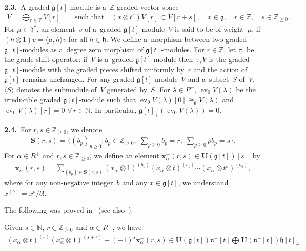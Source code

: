 \documentclass[pdftex]{sigma}
\DeclareMathOperator{\ev}{ev}
\numberwithin{equation}{section}
\begin{document}
{\bf 2.3.}~A graded $\mathfrak{g}[t]$-module is a~$\mathbb{Z}$-graded vector space
\begin{gather*}
V=\bigoplus_{r\in\mathbb{Z}} V[r] \qquad
\text{such that}
\quad
(x\otimes t^s) V[r]\subset V[r+s],
\quad
x\in\mathfrak{g},
\quad
r\in\mathbb{Z},
\quad
s\in\mathbb{Z}_{\geq0}.
\end{gather*}
For $\mu\in\mathfrak{h}^*$, an element~$v$ of a~graded $\mathfrak{g}[t]$-module~$V$ is said to be of weight~$\mu$, if
$(h\otimes 1)v=\langle \mu, h\rangle v$ for all $h\in \mathfrak{h}$.
We def\/ine a~morphism between two graded $\mathfrak{g}[t]$-modules as a~degree zero morphism of
$\mathfrak{g}[t]$-modules.
For $r\in\mathbb{Z}$, let $\tau_r$ be the grade shift operator: if~$V$ is a~graded $\mathfrak{g}[t]$-module then~$\tau_r
V$ is the graded $\mathfrak{g}[t]$-module with the graded pieces shifted uniformly by~$r$ and the action of~$\mathfrak{g}[t]$ remains unchanged.
For any graded $\mathfrak{g}[t]$-module~$V$ and a~subset~$S$ of~$V$, $\langle S\rangle$ denotes the submodule of~$V$ generated by~$S$.
For $\lambda\in P^+$, $\ev_0 V(\lambda)$ be the irreducible graded $\mathfrak{g}[t]$-module such
that $\ev_0 V(\lambda)[0]\cong_{\mathfrak{g}} V(\lambda)$ and $\ev_0 V(\lambda)[r]=0$
$\forall\, r\in \mathbb{N}$.
In particular, $\mathfrak{g}[t]_{+}(\ev_0 V(\lambda))=0$.

{\bf 2.4.}~For $r,s\in\mathbb{Z}_{\geq0}$, we denote
\begin{gather*}
\mathbf{S}(r,s)=\bigg\{(b_p)_{p\geq0}: b_p\in\mathbb{Z}_{\geq0},
\;
\sum\limits_{p\geq 0}b_p =r,
\;
\sum\limits_{p\geq0}pb_p=s\bigg\}.
\end{gather*}
For $\alpha\in R^{+}$ and $r,s\in\mathbb{Z}_{\geq0}$, we def\/ine an element
$\mathbf{x}^{-}_{\alpha}(r,s)\in\mathbf{U}(\mathfrak{g}[t])[s]$~by
\begin{gather*}
\mathbf{x}^{-}_{\alpha}(r,s)=\sum\limits_{(b_p)\in\mathbf{S}(r,s)} (x^{-}_{\alpha} \otimes 1)^{(b_0)}(x^{-}_{\alpha}
\otimes t)^{(b_1)}\cdots(x^{-}_{\alpha} \otimes t^s)^{(b_s)},
\end{gather*}
where for any non-negative integer~$b$ and any $x\in\mathfrak{g}[t]$, we understand
$x^{(b)}=x^b/b!$.

The following was proved in~\cite{G} (see also~\cite[Lemma 2.3]{CV}).
\begin{lemma}\label{garland}
Given $s\in\mathbb{N}$, $r\in\mathbb{Z}_{\geq0}$ and $\alpha\in R^{+}$, we have
\begin{gather*}
(x^{+}_{\alpha} \otimes t)^{(s)}(x^{-}_{\alpha} \otimes
1)^{(s+r)}-(-1)^s\mathbf{x}^{-}_{\alpha}(r,s)\in\mathbf{U}(\mathfrak{g}[t])\mathfrak{n}^{+}[t]\bigoplus
\mathbf{U}(\mathfrak{n}^{-}[t])\mathfrak{h}[t]_{+}.
\end{gather*}
\end{lemma}
\end{document}
